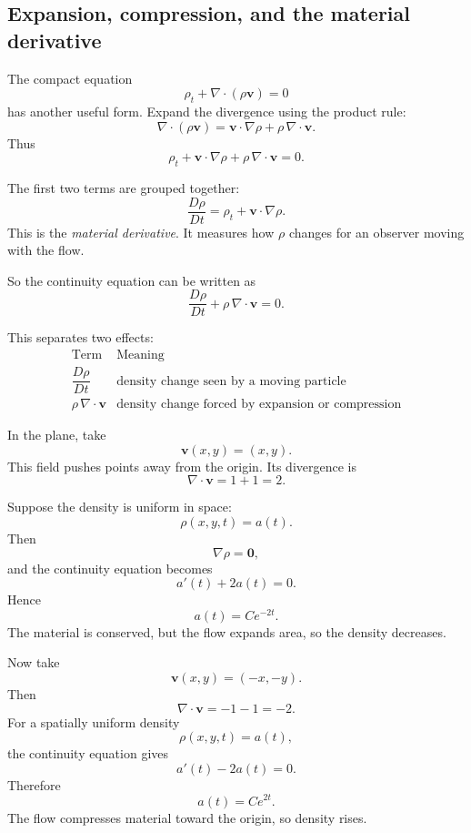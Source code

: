 \subsection{Expansion, compression, and the material derivative}

The compact equation
\[
    \rho_t+\nabla\cdot(\rho\mathbf v)=0
\]
has another useful form.  Expand the divergence using the product rule:
\[
    \nabla\cdot(\rho\mathbf v)
    =
    \mathbf v\cdot\nabla\rho
    +
    \rho\,\nabla\cdot\mathbf v.
\]
Thus
\[
\boxed{
    \rho_t+\mathbf v\cdot\nabla\rho+\rho\,\nabla\cdot\mathbf v=0.
}
\]

The first two terms are grouped together:
\[
\boxed{
    \frac{D\rho}{Dt}
    =
    \rho_t+\mathbf v\cdot\nabla\rho.
}
\]
This is the \emph{material derivative}.  It measures how \(\rho\) changes for an observer
moving with the flow.

So the continuity equation can be written as
\[
\boxed{
    \frac{D\rho}{Dt}+\rho\,\nabla\cdot\mathbf v=0.
}
\]

This separates two effects:
\[
\begin{array}{c|l}
\text{Term} & \text{Meaning} \\ \hline
\dfrac{D\rho}{Dt} & \text{density change seen by a moving particle}\\[3mm]
\rho\,\nabla\cdot\mathbf v & \text{density change forced by expansion or compression}
\end{array}
\]

\begin{example}
In the plane, take
\[
    \mathbf v(x,y)=(x,y).
\]
This field pushes points away from the origin.  Its divergence is
\[
    \nabla\cdot\mathbf v=1+1=2.
\]

Suppose the density is uniform in space:
\[
    \rho(x,y,t)=a(t).
\]
Then
\[
    \nabla\rho=\mathbf 0,
\]
and the continuity equation becomes
\[
    a'(t)+2a(t)=0.
\]
Hence
\[
\boxed{
    a(t)=Ce^{-2t}.
}
\]
The material is conserved, but the flow expands area, so the density decreases.
\end{example}

\begin{example}
Now take
\[
    \mathbf v(x,y)=(-x,-y).
\]
Then
\[
    \nabla\cdot\mathbf v=-1-1=-2.
\]
For a spatially uniform density
\[
    \rho(x,y,t)=a(t),
\]
the continuity equation gives
\[
    a'(t)-2a(t)=0.
\]
Therefore
\[
\boxed{
    a(t)=Ce^{2t}.
}
\]
The flow compresses material toward the origin, so density rises.
\end{example}

